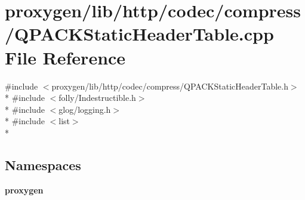 \section{proxygen/lib/http/codec/compress/\+Q\+P\+A\+C\+K\+Static\+Header\+Table.cpp File Reference}
\label{QPACKStaticHeaderTable_8cpp}
{\ttfamily \#include $<$proxygen/lib/http/codec/compress/\+Q\+P\+A\+C\+K\+Static\+Header\+Table.\+h$>$}\\*
{\ttfamily \#include $<$folly/\+Indestructible.\+h$>$}\\*
{\ttfamily \#include $<$glog/logging.\+h$>$}\\*
{\ttfamily \#include $<$list$>$}\\*
\subsection*{Namespaces}
\begin{DoxyCompactItemize}
\item 
 {\bf proxygen}
\end{DoxyCompactItemize}
